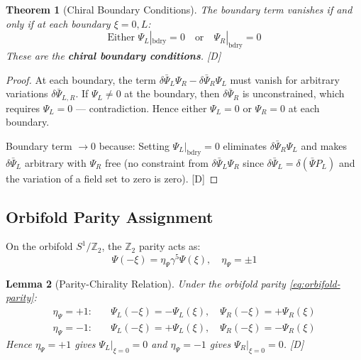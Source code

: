 \documentclass[11pt,a4paper]{article}
\newtheorem{theorem}{Theorem}[section]
\newtheorem{lemma}[theorem]{Lemma}
\begin{document}
\begin{theorem}[Chiral Boundary Conditions]
\label{thm:chiral-bc}
The boundary term vanishes if and only if at each boundary $\xi = 0, L$:
\begin{equation}
\boxed{
\text{Either } \Psi_L|_{\text{bdry}} = 0 \quad \text{or} \quad \Psi_R|_{\text{bdry}} = 0
}
\label{eq:chiral-bc}
\end{equation}
These are the \textbf{chiral boundary conditions}. [D]
\end{theorem}

\begin{proof}
At each boundary, the term $\delta\bar{\Psi}_L \Psi_R - \delta\bar{\Psi}_R \Psi_L$ must vanish
for arbitrary variations $\delta\bar{\Psi}_{L,R}$. If $\Psi_L \neq 0$ at the boundary, then
$\delta\bar{\Psi}_R$ is unconstrained, which requires $\Psi_L = 0$ --- contradiction. Hence
either $\Psi_L = 0$ or $\Psi_R = 0$ at each boundary.

Boundary term $\to 0$ because: Setting $\Psi_L|_{\text{bdry}} = 0$ eliminates $\delta\bar{\Psi}_R \Psi_L$
and makes $\delta\bar{\Psi}_L$ arbitrary with $\Psi_R$ free (no constraint from $\delta\bar{\Psi}_L \Psi_R$
since $\delta\bar{\Psi}_L = \delta(\bar{\Psi}P_L)$ and the variation of a field set to zero is zero). [D]
\end{proof}

\subsection{Orbifold Parity Assignment}

On the orbifold $S^1/\mathbb{Z}_2$, the $\mathbb{Z}_2$ parity acts as:
\begin{equation}
\Psi(-\xi) = \eta_\Psi \gamma^5 \Psi(\xi), \quad \eta_\Psi = \pm 1
\label{eq:orbifold-parity}
\end{equation}

\begin{lemma}[Parity-Chirality Relation]
\label{lem:parity-chiral}
Under the orbifold parity \eqref{eq:orbifold-parity}:
\begin{align}
\eta_\Psi = +1: &\quad \Psi_L(-\xi) = -\Psi_L(\xi), \quad \Psi_R(-\xi) = +\Psi_R(\xi) \label{eq:parity-plus} \\
\eta_\Psi = -1: &\quad \Psi_L(-\xi) = +\Psi_L(\xi), \quad \Psi_R(-\xi) = -\Psi_R(\xi) \label{eq:parity-minus}
\end{align}
Hence $\eta_\Psi = +1$ gives $\Psi_L|_{\xi=0} = 0$ and $\eta_\Psi = -1$ gives $\Psi_R|_{\xi=0} = 0$. [D]
\end{lemma}
\end{document}
